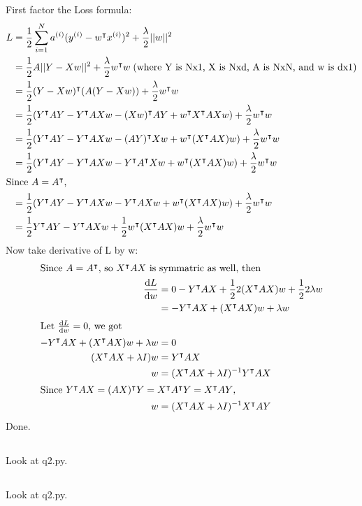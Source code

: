 \documentclass{article}
\begin{document}
\section{}
\subsection{}
First factor the Loss formula:
\begin{align*}
    L &= \frac{1}{2}\sum_{i = 1}^{N} a^{(i)} (y^{(i)} - w^\intercal x^{(i)} )^2 + \frac{\lambda}{2}||w||^2 \\
    &= \frac{1}{2}A||Y-Xw||^2 + \frac{\lambda}{2}w^\intercal w \; \text{(where Y is Nx1, X is Nxd, A is NxN, and w is dx1)}\\
    &= \frac{1}{2}(Y-Xw)^\intercal (A(Y-Xw)) + \frac{\lambda}{2}w^\intercal w\\
    &= \frac{1}{2}(Y^\intercal AY-Y^\intercal AXw -(Xw)^\intercal AY + w^\intercal X^\intercal AXw) + \frac{\lambda}{2}w^\intercal w\\
    &= \frac{1}{2}(Y^\intercal AY-Y^\intercal AXw - (AY)^\intercal Xw + w^\intercal (X^\intercal AX)w) + \frac{\lambda}{2}w^\intercal w\\
    &= \frac{1}{2}(Y^\intercal AY-Y^\intercal AXw - Y^\intercal A^\intercal Xw + w^\intercal (X^\intercal AX)w) + \frac{\lambda}{2}w^\intercal w\\
\intertext{Since $A = A^\intercal$,}
    &= \frac{1}{2}(Y^\intercal AY-Y^\intercal AXw - Y^\intercal AXw + w^\intercal (X^\intercal AX)w) + \frac{\lambda}{2}w^\intercal w\\
    &= \frac{1}{2}Y^\intercal AY-Y^\intercal AXw + \frac{1}{2}w^\intercal (X^\intercal AX)w + \frac{\lambda}{2}w^\intercal w\\
\end{align*}
Now take derivative of L by w:
\begin{align*}
\intertext{Since $A = A^\intercal$, so $X^\intercal AX$ is symmatric as well, then}
    \frac{\mathrm{d} L}{\mathrm{d} w} &= 0-Y^\intercal AX + \frac{1}{2}2(X^\intercal AX)w + \frac{1}{2}2\lambda w\\
    &= -Y^\intercal AX  + (X^\intercal AX)w + \lambda w\\
\intertext{Let $\frac{\mathrm{d} L}{\mathrm{d} w} = 0$, we got}
-Y^\intercal AX  + (X^\intercal AX)w + \lambda w &= 0\\
(X^\intercal AX + \lambda I)w &= Y^\intercal AX\\
w &= (X^\intercal AX + \lambda I)^{-1}Y^\intercal AX\\
\intertext{Since $Y^\intercal AX = (AX)^\intercal Y = X^\intercal A^\intercal Y = X^\intercal A Y$,}
w &= (X^\intercal AX + \lambda I)^{-1}X^\intercal AY\\
\end{align*}
Done.
\subsection{}
Look at q2.py.
\subsection{}
Look at q2.py.
\end{document}
